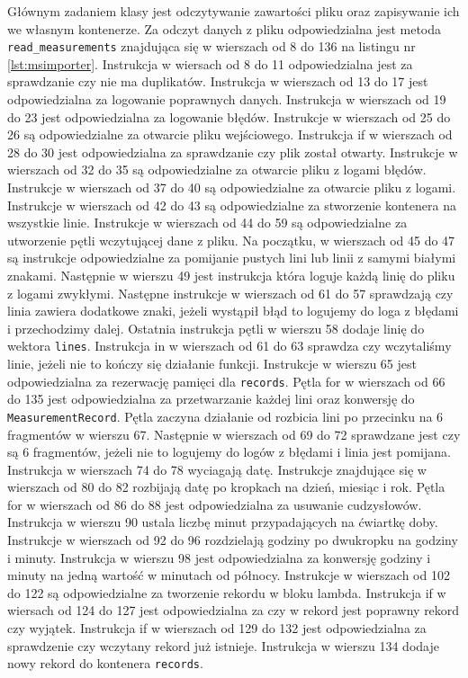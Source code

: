 Głównym zadaniem klasy jest odczytywanie zawartości pliku oraz zapisywanie ich we własnym kontenerze. Za odczyt danych z pliku odpowiedzialna jest metoda \texttt{read\_measurements} znajdująca się w wierszach od 8 do 136 na listingu nr \ref{lst:msimporter}.
Instrukcja w wiersach od 8 do 11 odpowiedzialna jest za sprawdzanie czy nie ma duplikatów.
Instrukcja w wierszach od 13 do 17 jest odpowiedzialna za logowanie poprawnych danych.
Instrukcja w wierszach od 19 do 23 jest odpowiedzialna za logowanie błędów.
Instrukcje w wierszach od 25 do 26 są odpowiedzialne za otwarcie pliku wejściowego.
Instrukcja if w wierszach od 28 do 30 jest odpowiedzialna za sprawdzanie czy plik został otwarty.
Instrukcje w wierszach od 32 do 35 są odpowiedzialne za otwarcie pliku z logami błędów.
Instrukcje w wierszach od 37 do 40 są odpowiedzialne za otwarcie pliku z logami.
Instrukcje w wierszach od 42 do 43 są odpowiedzialne za stworzenie kontenera na wszystkie linie.
Instrukcje w wierszach od 44 do 59 są odpowiedzialne za utworzenie pętli wczytującej dane z pliku. Na początku, w wierszach od 45 do 47 są instrukcje odpowiedzialne za pomijanie pustych lini lub linii z samymi białymi znakami. Następnie w wierszu 49 jest instrukcja która loguje każdą linię do pliku z logami zwykłymi. Następne instrukcje w wierszach od 61 do 57 sprawdzają czy linia zawiera dodatkowe znaki, jeżeli wystąpił błąd to logujemy do loga z błędami i przechodzimy dalej. Ostatnia instrukcja pętli w wierszu 58 dodaje linię do wektora \texttt{lines}.
Instrukcja in w wierszach od 61 do 63 sprawdza czy wczytaliśmy linie, jeżeli nie to kończy się działanie funkcji.
Instrukcje w wierszu 65 jest odpowiedzialna za rezerwację pamięci dla \texttt{records}.
Pętla for w wierszach od 66 do 135 jest odpowiedzialna za przetwarzanie każdej lini oraz konwersję do \texttt{MeasurementRecord}. Pętla zaczyna działanie od rozbicia lini po przecinku na 6 fragmentów w wierszu 67. Następnie w wierszach od 69 do 72 sprawdzane jest czy są 6 fragmentów, jeżeli nie to logujemy do logów z błędami i linia jest pomijana. Instrukcja w wierszach 74 do 78 wyciagają datę. Instrukcje znajdujące się w wierszach od 80 do 82 rozbijają datę po kropkach na dzień, miesiąc i rok.
Pętla for w wierszach od 86 do 88 jest odpowiedzialna za usuwanie cudzysłowów. Instrukcja w wierszu 90 ustala liczbę minut przypadających na ćwiartkę doby. Instrukcje w wierszach od 92 do 96 rozdzielają godziny po dwukropku na godziny i minuty.
Instrukcja w wierszu 98 jest odpowiedzialna za konwersję godziny i minuty na jedną wartość w minutach od północy.
Instrukcje w wierszach od 102 do 122 są odpowiedzialne za tworzenie rekordu w bloku lambda.
Instrukcja if w wiersach od 124 do 127 jest odpowiedzialna za czy w rekord jest poprawny rekord czy wyjątek.
Instrukcja if w wierszach od 129 do 132 jest odpowiedzialna za sprawdzenie czy wczytany rekord już istnieje.
Instrukcja w wierszu 134 dodaje nowy rekord do kontenera \texttt{records}.

